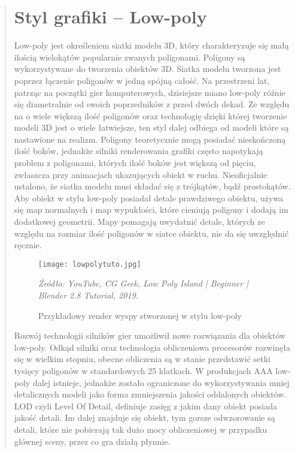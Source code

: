 \begin{quotation}
\section{Styl grafiki -- Low-poly}

\indent Low-poly jest określeniem siatki modelu 3D, który charakteryzuje się małą ilością wielokątów popularnie zwanych poligonami. Poligony są wykorzystywane do tworzenia obiektów 3D. Siatka modelu tworzona jest poprzez łączenie poligonów w jedną spójną całość. Na przestrzeni lat, patrząc na początki gier komputerowych, dzisiejsze miano low-poly róźnie się diametralnie od swoich poprzedników z przed dwóch dekad. Ze względu na o wiele większą ilość poligonów oraz technologię dzięki której tworzenie modeli 3D jest o wiele łatwiejsze, ten styl dalej odbiega od modeli które są nastawione na realizm. Poligony teoretycznie mogą posiadać nieskończoną ilość boków, jednakże silniki renderowania grafiki często napotykają problem z poligonami, których ilość boków jest większą od pięciu, zwłaszcza przy animacjach ukazujących obiekt w ruchu. Nieoficjalnie ustalono, że siatka modelu musi składać się z trójkątów, bądź prostokątów. Aby obiekt w stylu low-poly posiadał detale prawdziwego obiektu, używa się map normalnych i map wypukłości, które cieniują poligony i dodają im dodatkowej geometrii. Mapy pomagają uwydatnić detale, których ze względu na rozmiar ilość poligonów w siatce obiektu, nie da się uwzględnić ręcznie. 

\hfill \break

\begin{figure}[hbt!]
\centering
  \texttt{[image: lowpolytuto.jpg]}
  \caption{Przykładowy render wyspy stworzonej w stylu low-poly}\label{rys_1}
  \begin{minipage}[t]{0.75\linewidth}
    \emph{Źródło: YouTube, CG Geek, Low Poly Island | Beginner | Blender 2.8 Tutorial, 2019.}
  \end{minipage}
\end{figure}

\indent Rozwój technologii silników gier umożliwił nowe rozwiązania dla obiektów low-poly. Odkąd silniki oraz technologia obliczeniowa procesorów rozwinęła się w wielkim stopniu, obecne obliczenia są w stanie przedstawić setki tysięcy poligonów w standardowych 25 klatkach. 
W produkcjach AAA low-poly dalej istnieje, jednakże zostało ograniczone do wykorzystywania mniej detalicznych modeli jako forma zmniejszenia jakości oddalonych obiektów. LOD czyli Level Of Detail, definiuje zasięg z jakim dany obiekt posiada jakość detali. Im dalej znajduje się obiekt, tym gorsze odwzorowanie są detali, które nie pobierają tak dużo mocy obliczeniowej w przypadku głównej sceny, przez co gra działą płynnie. \cite{1}


\end{quotation}
